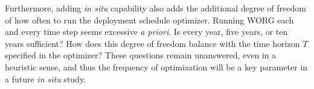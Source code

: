 Furthermore, adding \emph{in situ} capability also adds the additional
degree of freedom of how often to run the deployment schedule optimizer.
Running WORG each and every
time step seems excessive \emph{a priori}. Is every year, five years,
or ten years sufficient? How does this degree of freedom balance with the
time horizon $T$ specified in the optimizer? These questions remain unanswered, even
in a heuristic sense, and thus the frequency of optimization will be a key
parameter in a future \emph{in situ} study.
